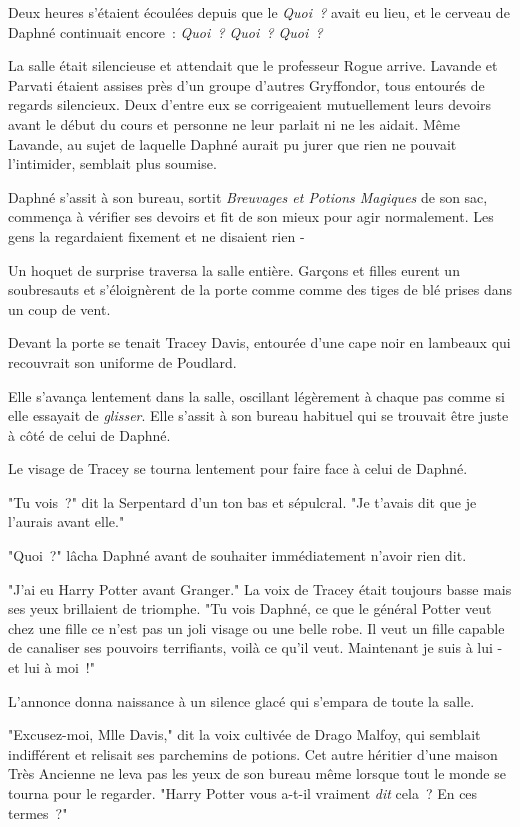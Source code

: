 Deux heures s'étaient écoulées depuis que le \emph{Quoi~?} avait eu lieu, et le cerveau de Daphné continuait encore~: \emph{Quoi~? Quoi~? Quoi~?}

La salle était silencieuse et attendait que le professeur Rogue arrive. Lavande et Parvati étaient assises près d'un groupe d'autres Gryffondor, tous entourés de regards silencieux. Deux d'entre eux se corrigeaient mutuellement leurs devoirs avant le début du cours et personne ne leur parlait ni ne les aidait. Même Lavande, au sujet de laquelle Daphné aurait pu jurer que rien ne pouvait l'intimider, semblait plus soumise.

Daphné s'assit à son bureau, sortit \emph{Breuvages et Potions Magiques} de son sac, commença à vérifier ses devoirs et fit de son mieux pour agir normalement. Les gens la regardaient fixement et ne disaient rien -

Un hoquet de surprise traversa la salle entière. Garçons et filles eurent un soubresauts et s'éloignèrent de la porte comme comme des tiges de blé prises dans un coup de vent.

Devant la porte se tenait Tracey Davis, entourée d'une cape noir en lambeaux qui recouvrait son uniforme de Poudlard.

Elle s'avança lentement dans la salle, oscillant légèrement à chaque pas comme si elle essayait de \emph{glisser}. Elle s'assit à son bureau habituel qui se trouvait être juste à côté de celui de Daphné.

Le visage de Tracey se tourna lentement pour faire face à celui de Daphné.

"Tu vois~?" dit la Serpentard d'un ton bas et sépulcral. "Je t'avais dit que je l'aurais avant elle."

"Quoi~?" lâcha Daphné avant de souhaiter immédiatement n'avoir rien dit.

"J'ai eu Harry Potter avant Granger." La voix de Tracey était toujours basse mais ses yeux brillaient de triomphe. "Tu vois Daphné, ce que le général Potter veut chez une fille ce n'est pas un joli visage ou une belle robe. Il veut un fille capable de canaliser ses pouvoirs terrifiants, voilà ce qu'il veut. Maintenant je suis à lui - et lui à moi~!"

L'annonce donna naissance à un silence glacé qui s'empara de toute la salle.

"Excusez-moi, Mlle Davis," dit la voix cultivée de Drago Malfoy, qui semblait indifférent et relisait ses parchemins de potions. Cet autre héritier d'une maison Très Ancienne ne leva pas les yeux de son bureau même lorsque tout le monde se tourna pour le regarder. "Harry Potter vous a-t-il vraiment \emph{dit} cela~? En ces termes~?"

